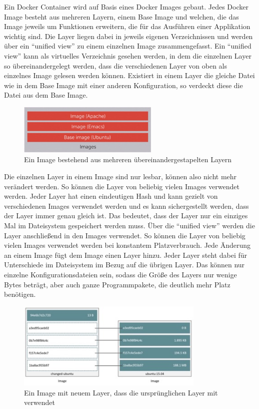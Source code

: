 Ein Docker Container wird auf Basis eines Docker Images gebaut. Jedes Docker Image besteht aus mehreren Layern, einem Base Image und welchen, die das Image jeweils um Funktionen erweitern, die für das Ausführen einer Applikation wichtig sind. Die Layer liegen dabei in jeweils eigenen Verzeichnissen und werden über ein “unified view” zu einem einzelnen Image zusammengefasst. Ein “unified view” kann als virtuelles Verzeichnis gesehen werden, in dem die einzelnen Layer so übereinandergelegt werden, dass die verschiedenen Layer von oben als einzelnes Image gelesen werden können. Existiert in einem Layer die gleiche Datei wie in dem Base Image mit einer anderen Konfiguration, so verdeckt diese die Datei aus dem Base Image.\\

\begin{figure}[!ht]
  \centering
  \includegraphics[width=0.6\textwidth]{images/docker-image.jpg}
  \caption{Ein Image bestehend aus mehreren übereinandergestapelten Layern \cite{7158965}}
\end{figure}

Die einzelnen Layer in einem Image sind nur lesbar, können also nicht mehr verändert werden. So können die Layer von beliebig vielen Images verwendet werden. Jeder Layer hat einen eindeutigen Hash und kann gezielt von verschiedenen Images verwendet werden und es kann sichergestellt werden, dass der Layer immer genau gleich ist. Das bedeutet, dass der Layer nur ein einziges Mal im Dateisystem gespeichert werden muss. Über die “unified view” werden die Layer anschließend in den Images verwendet. So können die Layer von beliebig vielen Images verwendet werden bei konstantem Platzverbrauch. Jede Änderung an einem Image fügt dem Image einen Layer hinzu. Jeder Layer steht dabei für Unterschiede im Dateisystem im Bezug auf die übrigen Layer. Das können nur einzelne Konfigurationsdateien sein, sodass die Größe des Layers nur wenige Bytes beträgt, aber auch ganze Programmpakete, die deutlich mehr Platz benötigen.\\

\begin{figure}[!ht]
  \centering
  \includegraphics[width=0.8\textwidth]{images/docker-image-layer-sharing.jpg}
  \caption{Ein Image mit neuem Layer, dass die ursprünglichen Layer mit verwendet \cite{docker:images}}
\end{figure}

